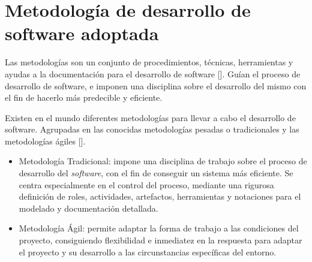 \section{Metodología de desarrollo de software adoptada}
Las metodologías son un conjunto de procedimientos, técnicas, herramientas y ayudas a la documentación para el desarrollo de software [\cite{91}]. Guían el proceso de desarrollo de software, e imponen una disciplina sobre el desarrollo del mismo con el fin de hacerlo más predecible y eficiente.

Existen en el mundo diferentes metodologías para llevar a cabo el desarrollo de software. Agrupadas en las conocidas metodologías pesadas o tradicionales y las metodologías ágiles [\cite{92}].

\begin{itemize}
\item Metodología Tradicional: impone una disciplina de trabajo sobre el proceso de desarrollo del \textit{software}, con el fin de conseguir un sistema más eficiente. Se centra especialmente en el control del proceso, mediante una rigurosa definición de roles, actividades, artefactos, herramientas y notaciones para el modelado y documentación detallada.
\item Metodología Ágil: permite adaptar la forma de trabajo a las condiciones del proyecto, consiguiendo flexibilidad e inmediatez en la respuesta para adaptar el proyecto y su desarrollo a las circunstancias específicas del entorno.
\end{itemize}


